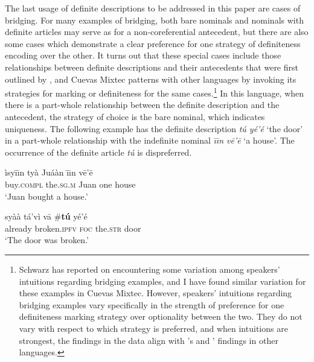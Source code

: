\documentclass[output=paper,modfonts,nonflat]{langsci/langscibook}
\begin{document}
The last usage of definite descriptions to be addressed in this paper are cases of bridging.  For many examples of bridging, both bare nominals and nominals with definite articles may serve as  for a non-coreferential antecedent, but there are also some cases which demonstrate a clear preference for one strategy of definiteness encoding over the other.  It turns out that these special cases include those relationships between definite descriptions and their antecedents that were first outlined by \citet{Schwarz2009}, and Cuevas Mixtec patterns with other languages by invoking its strategies for marking  or definiteness for the same cases.\footnote{Schwarz has reported on encountering some variation among speakers' intuitions regarding bridging examples, and I have found similar variation for these examples in Cuevas Mixtec.  However, speakers' intuitions regarding bridging examples vary specifically in the strength of preference for one definiteness marking strategy over optionality between the two.  They do not vary with respect to which strategy is preferred, and when intuitions are strongest, the findings in the data align with \citeauthor{Schwarz2009}'s and \citeauthor{Jenks2015}' findings in other languages.}  In this language, when there is a part-whole relationship between the definite description and the antecedent, the  strategy of choice is the bare nominal, which indicates uniqueness.  The following example has the definite description \textit{t\'u y\'e'\'e} `the door' in a part-whole relationship with the indefinite nominal \textit{\=\i\=\i n v\=e'\=e} `a house'.  The occurrence of the definite article \textit{t\'u} is dispreferred.

\ea {}\label{ex:cisneros:70}
\gll
\`isy\=\i\=\i n {\ob}ty\`a Ju\'a\`an{\cb} {\ob}\=\i\=\i n v\=e'\=e{\cb}\\
buy.\textsc{compl} {\db}the.\textsc{sg.m} Juan {\db}one house\\
\glt
`Juan bought a house.'

\ea
\gll
sy\`a\`a t\'a'v\`i v\=a {\ob}{\op}\textnormal{\#}\textbf{t\'u}{\cp} y\'e'\'e{\cb}\\
already broken.\textsc{ipfv} \textsc{foc} \phantom{[(\#}the.\textsc{str} door\\
\glt
`The door was broken.'
\z 
\z 
\end{document}
